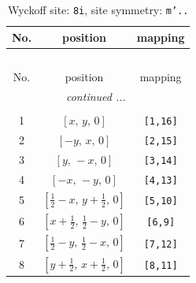 \documentclass[fleqn,8pt]{jsarticle}
\begin{document}
\renewcommand{\arraystretch}{1.2}
\begin{longtable}{ccc}
\caption{Wyckoff site: {\tt 8i}, site symmetry: {\tt m'..}}
 \\
 \hline \hline
No. & position & mapping \\ \hline \endfirsthead

\multicolumn{2}{l}{\tablename\ \thetable{}} \\
 \hline \hline
No. & position & mapping \\ \hline \endhead

 \hline \hline
\multicolumn{2}{r}{\footnotesize\it continued ...} \\ \endfoot

 \hline \hline
\multicolumn{2}{r}{} \\ \endlastfoot

1 & $\left[ x,\, y,\, 0 \right]$ & {\tt [1,16]} \\ \hline
2 & $\left[ - y,\, x,\, 0 \right]$ & {\tt [2,15]} \\ \hline
3 & $\left[ y,\, - x,\, 0 \right]$ & {\tt [3,14]} \\ \hline
4 & $\left[ - x,\, - y,\, 0 \right]$ & {\tt [4,13]} \\ \hline
5 & $\left[ \frac{1}{2} - x,\, y + \frac{1}{2},\, 0 \right]$ & {\tt [5,10]} \\ \hline
6 & $\left[ x + \frac{1}{2},\, \frac{1}{2} - y,\, 0 \right]$ & {\tt [6,9]} \\ \hline
7 & $\left[ \frac{1}{2} - y,\, \frac{1}{2} - x,\, 0 \right]$ & {\tt [7,12]} \\ \hline
8 & $\left[ y + \frac{1}{2},\, x + \frac{1}{2},\, 0 \right]$ & {\tt [8,11]} \\
\end{longtable}
\renewcommand{\arraystretch}{1.2}
\end{document}
